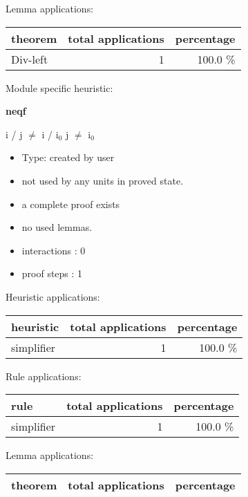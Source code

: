 \documentclass[a4paper]{article}
\begin{document}
Lemma applications:

\begin{supertabular}{l|r|r}
theorem	        & total applications & percentage \\ \hline
Div-left & 1 & 100.0 \% \\

\end{supertabular}

Module specific heuristic:

\pagebreak

{\LARGE\bf neqf}\label{lemma-neqf}

\medskip

 \Fol i / j $\neq$ i / $\mbox{i}_{0}$ \Imp j $\neq$ $\mbox{i}_{0}$

\begin{itemize}

\item Type: created by user

\item not used by any units in proved state.
\item       a complete proof exists
\item       no used lemmas.
\item       interactions : 0
\item       proof steps  : 1
\end{itemize}

\medskip


Heuristic applications:

\begin{supertabular}{l|r|r}
heuristic	& total applications & percentage \\ \hline
simplifier & 1 & 100.0 \% \\

\end{supertabular}

Rule applications:

\begin{supertabular}{l|r|r}
rule	        & total applications & percentage \\ \hline
simplifier & 1 & 100.0 \% \\

\end{supertabular}

Lemma applications:

\begin{supertabular}{l|r|r}
theorem	        & total applications & percentage \\ \hline

\end{supertabular}
\end{document}
